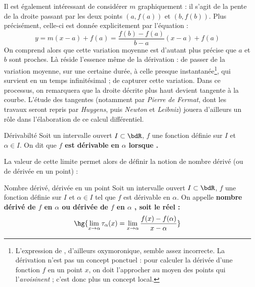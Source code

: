 \documentclass[a4paper,french,bookmarks]{article}
\begin{document}
\begin{minipage}{\linewidth}
    Il est également intéressant de considérer \(m\) graphiquement : il s'agit de la pente de la droite passant par les deux points \((a, f(a))\) et \((b, f(b))\). Plus précisément, celle-ci est donnée explicitement par l'équation :
    \[ y = m(x-a) + f(a) = \dfrac{f(b) - f(a)}{b - a}(x-a) + f(a)\]
    On comprend alors que cette variation moyenne  est d'autant plus précise que \(a\) et \(b\) sont proches. Là réside l'essence même de la dérivation : de passer de la variation moyenne, sur une certaine durée, à celle presque instantanée\footnote{L'expression de , d'ailleurs oxymoronique, semble assez incorrecte. La dérivation n'est pas un concept ponctuel : pour calculer la dérivée d'une fonction \(f\) en un point \(x\), on doit l'approcher au moyen des points qui l'\textit{avoisinent} ; c'est donc plus un concept local.}, qui survient en un temps infinitésimal ; de capturer cette variation. Dans ce processus, on remarquera que la droite décrite plus haut devient tangente à la courbe. L'étude des tangentes (notamment par \textsl{Pierre de Fermat}, dont les travaux seront repris par \textsl{Huygens}, puis \textsl{Newton} et \textsl{Leibniz}) jouera d'ailleurs un rôle dans l'élaboration de ce calcul différentiel. 
\end{minipage}

\begin{definition}{Dérivabilté}{}
    Soit un intervalle ouvert \(I \subset \bdR\), \(f\) une fonction définie sur \(I\) et \(\alpha \in I\). On dit que \bf{\(f\) est dérivable en \(\alpha\)} lorsque .
\end{definition}

La valeur de cette limite permet alors de définir la notion de nombre dérivé (ou de dérivée en un point) :

\begin{definition}{Nombre dérivé, dérivée en un point}{}
    Soit un intervalle ouvert \(I \subset \bdR\), \(f\) une fonction définie sur \(I\) et \(\alpha \in I\) tel que \(f\) est dérivable en \(\alpha\). On appelle \bf{nombre dérivé de \(f\) en \(\alpha\)} ou \bf{dérivée de \(f\) en \(\alpha\)} , soit le réel :
    \[ \hg{\lim\limits_{x \to \alpha} \tau_\alpha(x) = \lim\limits_{x \to \alpha} \dfrac{f(x) - f(\alpha)}{x - \alpha}} \]
\end{definition}
\end{document}
